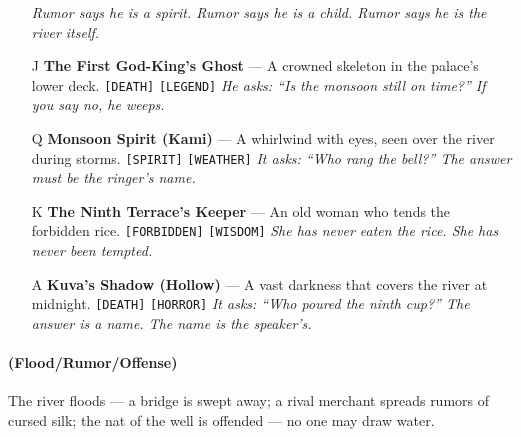 \begin{enumerate}
  \hfill \textit{Rumor says he is a spirit. Rumor says he is a child. Rumor says he is the river itself.}
\item[J] \textbf{The First God-King's Ghost} --- A crowned skeleton in the palace's lower deck. \texttt{[DEATH]} \texttt{[LEGEND]}
  \hfill \textit{He asks: ``Is the monsoon still on time?'' If you say no, he weeps.}
\item[Q] \textbf{Monsoon Spirit (Kami)} --- A whirlwind with eyes, seen over the river during storms. \texttt{[SPIRIT]} \texttt{[WEATHER]}
  \hfill \textit{It asks: ``Who rang the bell?'' The answer must be the ringer's name.}
\item[K] \textbf{The Ninth Terrace's Keeper} --- An old woman who tends the forbidden rice. \texttt{[FORBIDDEN]} \texttt{[WISDOM]}
  \hfill \textit{She has never eaten the rice. She has never been tempted.}
\item[A] \textbf{Kuva's Shadow (Hollow)} --- A vast darkness that covers the river at midnight. \texttt{[DEATH]} \texttt{[HORROR]}
  \hfill \textit{It asks: ``Who poured the ninth cup?'' The answer is a name. The name is the speaker's.}
\end{enumerate}

\paragraph*{(Flood/Rumor/Offense)} The river floods --- a bridge is swept away; a rival merchant spreads rumors of cursed silk; the nat of the well is offended --- no one may draw water.

